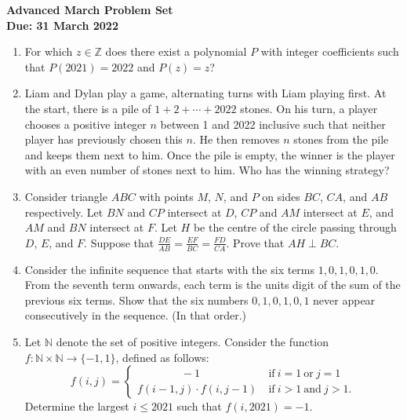 \documentclass{article}
\newcommand*{\sptext}[1]{\ \text{#1}\ }
\begin{document}
\thispagestyle{empty}

\begin{center}
  \textbf{\Large Advanced March Problem Set}
  \\ \vspace{1em}
  \textbf{\large Due: 31 March 2022}
\end{center}

\smallskip

\begin{enumerate}[itemsep=\fill]

\item %
For which $z \in \mathbb{Z}$ does there exist a polynomial $P$ with integer coefficients such that $P(2021) = 2022$ and $P(z) = z$?


\item %
Liam and Dylan play a game, alternating turns with Liam playing first.
At the start, there is a pile of $1+2+\dotsb+2022$ stones.
On his turn, a player chooses a positive integer $n$ between 1 and 2022 inclusive such that neither player has previously chosen this $n$.
He then removes $n$ stones from the pile and keeps them next to him.
Once the pile is empty, the winner is the player with an even number of stones next to him.
Who has the winning strategy? 


\item %
Consider triangle $ABC$ with points $M$, $N$, and $P$ on sides $BC$, $CA$, and $AB$ respectively.
Let $BN$ and $CP$ intersect at $D$, $CP$ and $AM$ intersect at $E$, and $AM$ and $BN$ intersect at $F$.
Let $H$ be the centre of the circle passing through $D$, $E$, and $F$.
Suppose that $\frac{DE}{AB} = \frac{EF}{BC} = \frac{FD}{CA}$.
Prove that $AH \perp BC$.


\item %
Consider the infinite sequence that starts with the six terms $1, 0, 1, 0, 1, 0$. From the seventh term onwards, each term is the units digit of the sum of the previous six terms. Show that the six numbers $0, 1, 0, 1, 0, 1$ never appear consecutively in the sequence. (In that order.)


\item %
Let $\mathbb{N}$ denote the set of positive integers. Consider the function $f: \mathbb{N} \times \mathbb{N} \to \{-1,1\}$, defined as follows: 
\[
  f(i,j) = \begin{cases}
    \mspace{72mu} -1 & \sptext{if} i=1 \sptext{or} j=1 \\
    f(i-1,j) \cdot f(i,j-1) & \sptext{if} i>1 \sptext{and} j>1.
  \end{cases}
\]
Determine the largest $i \leq 2021$ such that $f(i,2021) = -1$.



\end{enumerate}
\end{document}
